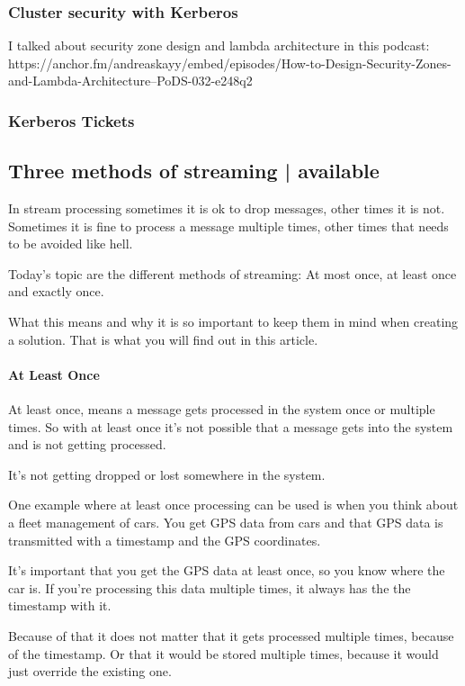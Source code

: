 \documentclass[12pt]{scrartcl} %
\begin{document}
\subsubsection{Cluster security with Kerberos}

I talked about security zone design and lambda architecture in this podcast: https://anchor.fm/andreaskayy/embed/episodes/How-to-Design-Security-Zones-and-Lambda-Architecture--PoDS-032-e248q2
 
\subsubsection{Kerberos Tickets} 
 
\subsection{Three methods of streaming | available}

In stream processing sometimes it is ok to drop messages, other times it is not. Sometimes it is fine to process a message multiple times, other times that needs to be avoided like hell.

Today’s topic are the different methods of streaming: At most once, at least once and exactly once.

What this means and why it is so important to keep them in mind when creating a solution. That is what you will find out in this article.

\paragraph{At Least Once}

At least once, means a message gets processed in the system once or multiple times. So with at least once it’s not possible that a message gets into the system and is not getting processed.

It’s not getting dropped or lost somewhere in the system.

One example where at least once processing can be used is when you think about a fleet management of cars. You get GPS data from cars and that GPS data is transmitted with a timestamp and the GPS coordinates.

It’s important that you get the GPS data at least once, so you know where the car is. If you’re processing this data multiple times, it always has the the timestamp with it.

Because of that it does not matter that it gets processed multiple times, because of the timestamp. Or that it would be stored multiple times, because it would just override the existing one.
\end{document}
